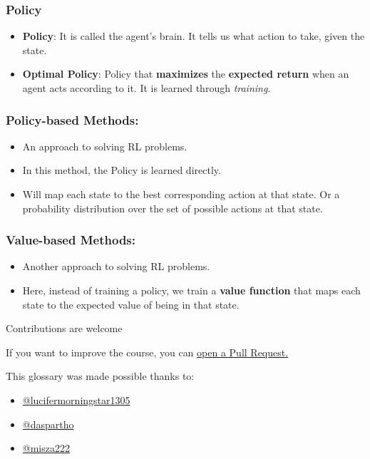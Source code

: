 \documentclass[11pt,a4paper]{article}
\begin{document}
\subsubsection{Policy}\label{policy}

\begin{itemize}
\tightlist
\item
  \textbf{Policy}: It is called the agent's brain. It tells us what action to take, given the state.
\item
  \textbf{Optimal Policy}: Policy that \textbf{maximizes} the \textbf{expected return} when an agent acts according to it. It is learned through \emph{training}.
\end{itemize}

\subsubsection{Policy-based Methods:}\label{policy-based-methods-1}

\begin{itemize}
\tightlist
\item
  An approach to solving RL problems.
\item
  In this method, the Policy is learned directly.
\item
  Will map each state to the best corresponding action at that state. Or a probability distribution over the set of possible actions at that state.
\end{itemize}

\subsubsection{Value-based Methods:}\label{value-based-methods-1}

\begin{itemize}
\tightlist
\item
  Another approach to solving RL problems.
\item
  Here, instead of training a policy, we train a \textbf{value function} that maps each state to the expected value of being in that state.
\end{itemize}

Contributions are welcome

If you want to improve the course, you can \href{https://github.com/huggingface/deep-rl-class/pulls}{open a Pull Request.}

This glossary was made possible thanks to:

\begin{itemize}
\tightlist
\item
  \href{https://github.com/lucifermorningstar1305}{@lucifermorningstar1305}
\item
  \href{https://github.com/daspartho}{@daspartho}
\item
  \href{https://github.com/misza222}{@misza222}
\end{itemize}
\end{document}
